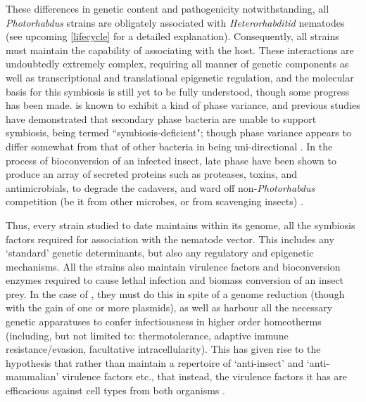 These differences in genetic content and pathogenicity notwithstanding, all \emph{Photorhabdus} strains are obligately associated with \emph{Heterorhabditid} nematodes (see upcoming \vref{lifecycle} for a detailed explanation). Consequently, all strains must maintain the capability of associating with the host. These interactions are undoubtedly extremely complex, requiring all manner of genetic components as well as transcriptional and translational epigenetic regulation, and the molecular basis for this symbiosis is still yet to be fully understood, though some progress has been made. \Pa{} is known to exhibit a kind of phase variance, and previous studies have demonstrated that secondary phase bacteria are unable to support symbiosis, being termed ``symbiosis-deficient"; though \Pa{} phase variance appears to differ somewhat from that of other bacteria in being uni-directional \citep{Ffrench-Constant2003}. In the process of bioconversion of an infected insect, late phase \Pa{} have been shown to produce an array of secreted proteins such as proteases, toxins, and antimicrobials, to degrade the cadavers, and ward off non-\emph{Photorhabdus} competition (be it from other microbes, or from scavenging insects) \citep{Daborn2001a,Baur1998}. 

Thus, every \Pa{} strain studied to date maintains within its genome, all the symbiosis factors required for association with the nematode vector. This includes any `standard' genetic determinants, but also any regulatory and epigenetic mechanisms. All the strains also maintain virulence factors and bioconversion enzymes required to cause lethal infection and biomass conversion of an insect prey. In the case of \Pasy, they must do this in spite of a genome reduction (though with the gain of one or more plasmids), as well as harbour all the necessary genetic apparatuses to confer infectiousness in higher order homeotherms (including, but not limited to: thermotolerance, adaptive immune resistance/evasion, facultative intracellularity). This has given rise to the hypothesis that rather than maintain a repertoire of `anti-insect' and `anti-mammalian' virulence factors etc., that instead, the virulence factors it has are efficacious against cell types from both organisms \citep{Waterfield2004a}.

